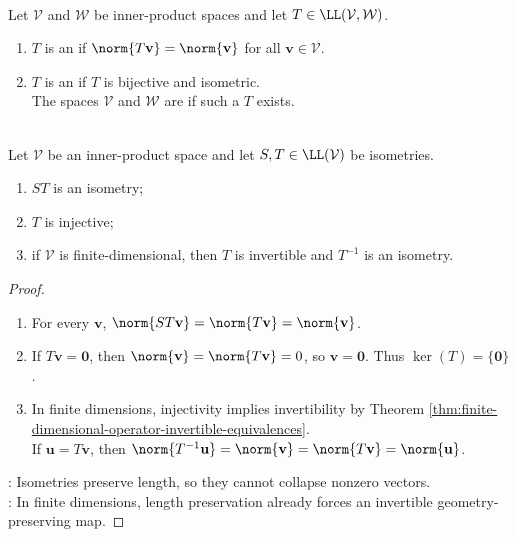 \begin{definition} \label{def:isometry-linear-map} \\
Let $\mathcal{V}$ and $\mathcal{W}$ be inner-product spaces and let $T\in\LL(\mathcal{V},\mathcal{W})$.
\begin{enumerate}[label=(\roman*)]
\setlength{\itemsep}{0pt}
\item $T$ is an  if $\norm{T\mathbf{v}}=\norm{\mathbf{v}}$ for all $\mathbf{v}\in\mathcal{V}$.
\item $T$ is an  if $T$ is bijective and isometric.\\
The spaces $\mathcal{V}$ and $\mathcal{W}$ are  if such a $T$ exists.
\end{enumerate}
\end{definition}

\begin{proposition} \label{prop:basic-isometry-properties} \\
Let $\mathcal{V}$ be an inner-product space and let $S,T\in\LL(\mathcal{V})$ be isometries.
\begin{enumerate}[label=\roman*.]
\setlength{\itemsep}{0pt}
\item $ST$ is an isometry;
\item $T$ is injective;
\item if $\mathcal{V}$ is finite-dimensional, then $T$ is invertible and $T^{-1}$ is an isometry.
\end{enumerate}
\begin{proof}
\begin{enumerate}[label=(\roman*)]
\setlength{\itemsep}{0pt}
\item For every $\mathbf{v}$, $\norm{ST\mathbf{v}}=\norm{T\mathbf{v}}=\norm{\mathbf{v}}$.
\item If $T\mathbf{v}=\mathbf{0}$, then $\norm{\mathbf{v}}=\norm{T\mathbf{v}}=0$, so $\mathbf{v}=\mathbf{0}$. Thus $\ker(T)=\{\mathbf{0}\}$.
\item In finite dimensions, injectivity implies invertibility by Theorem \ref{thm:finite-dimensional-operator-invertible-equivalences}.\\
If $\mathbf{u}=T\mathbf{v}$, then $\norm{T^{-1}\mathbf{u}}=\norm{\mathbf{v}}=\norm{T\mathbf{v}}=\norm{\mathbf{u}}$.
\end{enumerate}
: Isometries preserve length, so they cannot collapse nonzero vectors.\\
: In finite dimensions, length preservation already forces an invertible geometry-preserving map.
\end{proof}
\end{proposition}

